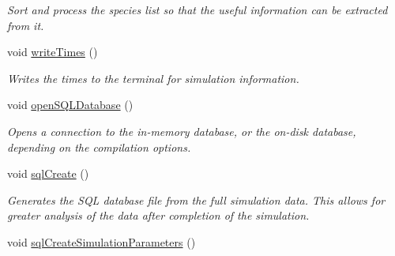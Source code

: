 \begin{DoxyCompactItemize}
\begin{DoxyCompactList}\small\item\em Sort and process the species list so that the useful information can be extracted from it. \end{DoxyCompactList}\item 
void \hyperlink{class_tree_ab8785fc9e27868a56335048321c13290}{write\+Times} ()\hypertarget{class_tree_ab8785fc9e27868a56335048321c13290}{}\label{class_tree_ab8785fc9e27868a56335048321c13290}

\begin{DoxyCompactList}\small\item\em Writes the times to the terminal for simulation information. \end{DoxyCompactList}\item 
void \hyperlink{class_tree_a9e240bbfc3139b290a0dead741f560bf}{open\+S\+Q\+L\+Database} ()\hypertarget{class_tree_a9e240bbfc3139b290a0dead741f560bf}{}\label{class_tree_a9e240bbfc3139b290a0dead741f560bf}

\begin{DoxyCompactList}\small\item\em Opens a connection to the in-\/memory database, or the on-\/disk database, depending on the compilation options. \end{DoxyCompactList}\item 
void \hyperlink{class_tree_ae784a6ed362f6c5263ee797759f715b6}{sql\+Create} ()\hypertarget{class_tree_ae784a6ed362f6c5263ee797759f715b6}{}\label{class_tree_ae784a6ed362f6c5263ee797759f715b6}

\begin{DoxyCompactList}\small\item\em Generates the S\+QL database file from the full simulation data. This allows for greater analysis of the data after completion of the simulation. \end{DoxyCompactList}\item 
void \hyperlink{class_tree_a199f47b62b9b10917ff8b89d20c543a7}{sql\+Create\+Simulation\+Parameters} ()\hypertarget{class_tree_a199f47b62b9b10917ff8b89d20c543a7}{}\label{class_tree_a199f47b62b9b10917ff8b89d20c543a7}


\end{DoxyCompactItemize}
